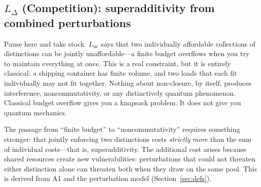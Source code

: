 \documentclass[11pt]{article}
\begin{document}
\subsection{\texorpdfstring{$L_{\Delta}$}{L Delta} (Competition): superadditivity from combined perturbations}

Pause here and take stock.  $L_{\mathrm{nc}}$ says that two individually affordable collections of distinctions can be jointly unaffordable---a finite budget overflows when you try to maintain everything at once.  This is a real constraint, but it is entirely classical: a shipping container has finite volume, and two loads that each fit individually may not fit together.  Nothing about non-closure, by itself, produces interference, noncommutativity, or any distinctively quantum phenomenon.  Classical budget overflow gives you a knapsack problem.  It does not give you quantum mechanics.

The passage from ``finite budget'' to ``noncommutativity'' requires something stronger: that jointly enforcing two distinctions costs \emph{strictly more} than the sum of individual costs---that is, superadditivity.  The additional cost arises because shared resources create new vulnerabilities: perturbations that could not threaten either distinction alone can threaten both when they draw on the same pool.  This is derived from A1 and the perturbation model (Section~\ref{sec:defs}).
\end{document}
